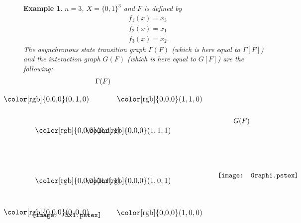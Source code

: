 \documentclass[11pt]{article}
\newtheorem{example}{Example}
\begin{document}
\begin{example} 
$n=3$, $X=\{0,1\}^3$ and $F$ is defined by 
\[
\begin{array}{l}
f_1(x)=x_3\\
f_2(x)=x_1\\
f_3(x)=x_2.
\end{array}
\]
The asynchronous state transition graph $\Gamma(F)$ (which is here
equal to $\Gamma[F]$) and the interaction graph $G(F)$ (which is here
equal to $G[F]$) are the following:
\[
\begin{array}{c}
\Gamma(F)\\[5mm]
\begin{picture}(0,0)\texttt{[image: Ex1.pstex]}\end{picture}\setlength{\unitlength}{3947sp}\begingroup\makeatletter\ifx\SetFigFont\undefined \gdef\SetFigFont#1#2#3#4#5{\reset@font\fontsize{#1}{#2pt}\fontfamily{#3}\fontseries{#4}\fontshape{#5}\selectfont}\fi\endgroup \begin{picture}(3377,2896)(1012,-920)
\put(2101,1094){\makebox(0,0)[b]{\smash{{\SetFigFont{11}{13.2}{\rmdefault}{\mddefault}{\updefault}{\color[rgb]{0,0,0}$(0,1,1)$}}}}}
\put(2101,-106){\makebox(0,0)[b]{\smash{{\SetFigFont{11}{13.2}{\rmdefault}{\mddefault}{\updefault}{\color[rgb]{0,0,0}$(0,0,1)$}}}}}
\put(3301,-106){\makebox(0,0)[b]{\smash{{\SetFigFont{11}{13.2}{\rmdefault}{\mddefault}{\updefault}{\color[rgb]{0,0,0}$(1,0,1)$}}}}}
\put(3301,1094){\makebox(0,0)[b]{\smash{{\SetFigFont{11}{13.2}{\rmdefault}{\mddefault}{\updefault}{\color[rgb]{0,0,0}$(1,1,1)$}}}}}
\put(1351,-856){\makebox(0,0)[b]{\smash{{\SetFigFont{11}{13.2}{\rmdefault}{\mddefault}{\updefault}{\color[rgb]{0,0,0}$(0,0,0)$}}}}}
\put(1351,1844){\makebox(0,0)[b]{\smash{{\SetFigFont{11}{13.2}{\rmdefault}{\mddefault}{\updefault}{\color[rgb]{0,0,0}$(0,1,0)$}}}}}
\put(4051,1844){\makebox(0,0)[b]{\smash{{\SetFigFont{11}{13.2}{\rmdefault}{\mddefault}{\updefault}{\color[rgb]{0,0,0}$(1,1,0)$}}}}}
\put(4051,-871){\makebox(0,0)[b]{\smash{{\SetFigFont{11}{13.2}{\rmdefault}{\mddefault}{\updefault}{\color[rgb]{0,0,0}$(1,0,0)$}}}}}
\end{picture} \end{array}
~~~~~~~~~~~~~~~~
\begin{array}{c}
G(F)\\[5mm]
\begin{picture}(0,0)\texttt{[image: Graph1.pstex]}\end{picture}\setlength{\unitlength}{3947sp}\begingroup\makeatletter\ifx\SetFigFont\undefined \gdef\SetFigFont#1#2#3#4#5{\reset@font\fontsize{#1}{#2pt}\fontfamily{#3}\fontseries{#4}\fontshape{#5}\selectfont}\fi\endgroup \begin{picture}(1128,1006)(1987,-2454)

\end{picture}
\end{array}\]
\end{example}
\end{document}
